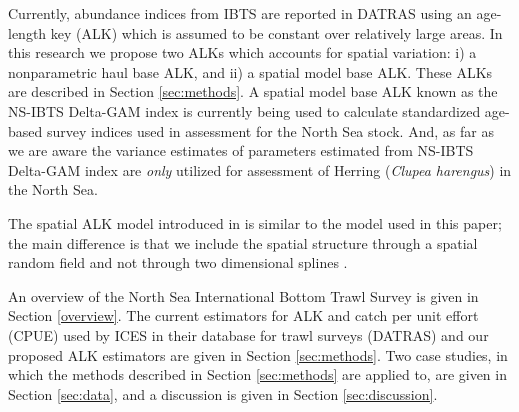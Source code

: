 \documentclass[a4paper 12pt]{article}
\numberwithin{equation}{section}
\begin{document}
Currently, abundance indices from IBTS are reported in DATRAS \citep{datras} using an age-length key (ALK) \citep{fridriksson1934calculation} which is assumed to be constant over relatively large areas. In this research we propose two ALKs which accounts for spatial variation: i) a nonparametric  haul base ALK, and ii) a spatial model base ALK. These ALKs are described in Section \ref{sec:methods}. %
A spatial model base ALK \citep{berg2012spatial, berg2014evaluation} known as the NS-IBTS Delta-GAM index \citep{ICES2016b} is currently being used to calculate standardized age-based survey indices used in assessment for the North Sea stock. And, as far as we are aware the variance estimates of parameters estimated from NS-IBTS Delta-GAM index  are \textit{only} utilized for assessment of Herring (\textit{Clupea harengus}) in the North Sea.

The spatial ALK model introduced in \citet{berg2012spatial} is similar to the model used in this paper; the main difference is that we include the spatial structure through a spatial random field \citep{lindgren2011explicit} and not through two dimensional splines \citep{wood2017generalized}.

 An  overview of the  North Sea International Bottom Trawl Survey is given in Section \ref{overview}. The current estimators for ALK and catch per unit effort (CPUE) used by ICES in their database for trawl surveys (DATRAS) and our proposed ALK estimators are given in Section \ref{sec:methods}. Two case studies, in which the methods described in Section \ref{sec:methods} are applied to, are given in Section \ref{sec:data}, and a discussion is given in Section \ref{sec:discussion}.
\end{document}
